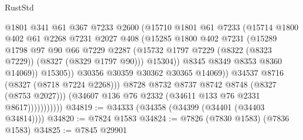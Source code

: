 \begin{lexlean}{RustStd}
\begin{coremodule}
{\begin{coremodule}
{{{{{{{{{{{{{{{{{{{{{{{{{{{{{{{{{{{{{{{{{{{{{{{{{{{{{{                                  @1801
                                  @341
                                  @61
                                  @367
                                  @7233
                                  @2600
                                  (@15710
                                    @1801
                                    @61
                                    @7233
                                    (@15714
                                      @1800
                                      @402
                                      @61
                                      @2268
                                      @7231
                                      @2027
                                      @408
                                      (@15285
                                        @1800
                                        @402
                                        @7231
                                        (@15289
                                          @1798
                                          @97
                                          @90
                                          @66
                                          @7229
                                          @2287
                                          (@15732
                                            @1797
                                            @7229
                                            (@8322 (@8323 @7229))
                                            (@8327 (@8329 @1797 @90)))
                                          @15304))
                                      @8345
                                      @8349
                                      @8353
                                      @8360
                                      @14069))
                                  @15305))
                              @30356
                              @30359
                              @30362
                              @30365
                              @14069))
                          @34537
                          @8716
                          (@8327 (@8718 @7224 @2268)))
                        @8728
                        @8732
                        @8737
                        @8742
                        @8748
                        (@8327 (@8753 @2027)))
                      (@34607 @136 @76 @2332 (@34611 @133 @76 @2331 @8617)))))))))))
@34819 := @34333 (@34358 (@34399 (@34401 (@34403 @34814))))
@34820 := @7824 @1583
@34824 := @7826 (@7830 @1583) (@7836 @1583)
@34825 := @7845 @29901
}}}}}}}}}}}}}}}}}}}}}}}}}}}}}}}}}}}}}}}}}}}}}}}}}}}}}}
\end{coremodule}}
\end{coremodule}
\end{lexlean}
